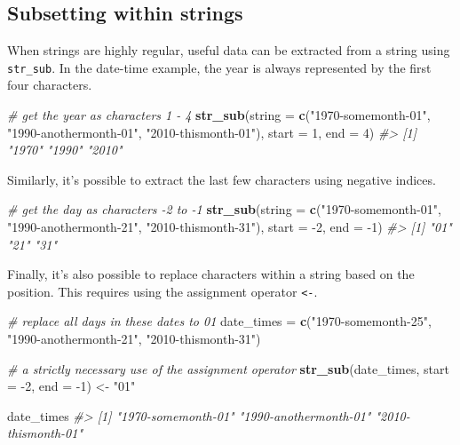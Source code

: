 \documentclass[]{book}
\newenvironment{Shaded}{}{}
\newcommand{\CommentTok}[1]{\textcolor[rgb]{0.38,0.63,0.69}{\textit{#1}}}
\newcommand{\DataTypeTok}[1]{\textcolor[rgb]{0.56,0.13,0.00}{#1}}
\newcommand{\DecValTok}[1]{\textcolor[rgb]{0.25,0.63,0.44}{#1}}
\newcommand{\KeywordTok}[1]{\textcolor[rgb]{0.00,0.44,0.13}{\textbf{#1}}}
\newcommand{\NormalTok}[1]{#1}
\newcommand{\StringTok}[1]{\textcolor[rgb]{0.25,0.44,0.63}{#1}}
\begin{document}
\hypertarget{subsetting-within-strings}{%
\subsection{Subsetting within strings}\label{subsetting-within-strings}}

When strings are highly regular, useful data can be extracted from a string using \texttt{str\_sub}. In the date-time example, the year is always represented by the first four characters.

\begin{Shaded}
\begin{Highlighting}[]
\CommentTok{# get the year as characters 1 - 4}
\KeywordTok{str_sub}\NormalTok{(}\DataTypeTok{string =} \KeywordTok{c}\NormalTok{(}\StringTok{"1970-somemonth-01"}\NormalTok{,}
                   \StringTok{"1990-anothermonth-01"}\NormalTok{,}
                   \StringTok{"2010-thismonth-01"}\NormalTok{),}
        \DataTypeTok{start =} \DecValTok{1}\NormalTok{, }\DataTypeTok{end =} \DecValTok{4}\NormalTok{)}
\CommentTok{#> [1] "1970" "1990" "2010"}
\end{Highlighting}
\end{Shaded}

Similarly, it's possible to extract the last few characters using negative indices.

\begin{Shaded}
\begin{Highlighting}[]
\CommentTok{# get the day as characters -2 to -1}
\KeywordTok{str_sub}\NormalTok{(}\DataTypeTok{string =} \KeywordTok{c}\NormalTok{(}\StringTok{"1970-somemonth-01"}\NormalTok{,}
                   \StringTok{"1990-anothermonth-21"}\NormalTok{,}
                   \StringTok{"2010-thismonth-31"}\NormalTok{),}
        \DataTypeTok{start =} \DecValTok{-2}\NormalTok{, }\DataTypeTok{end =} \DecValTok{-1}\NormalTok{)}
\CommentTok{#> [1] "01" "21" "31"}
\end{Highlighting}
\end{Shaded}

Finally, it's also possible to replace characters within a string based on the position. This requires using the assignment operator \texttt{\textless{}-}.

\begin{Shaded}
\begin{Highlighting}[]
\CommentTok{# replace all days in these dates to 01}
\NormalTok{date_times =}\StringTok{ }\KeywordTok{c}\NormalTok{(}\StringTok{"1970-somemonth-25"}\NormalTok{,}
               \StringTok{"1990-anothermonth-21"}\NormalTok{,}
               \StringTok{"2010-thismonth-31"}\NormalTok{)}

\CommentTok{# a strictly necessary use of the assignment operator}
\KeywordTok{str_sub}\NormalTok{(date_times,}
        \DataTypeTok{start =} \DecValTok{-2}\NormalTok{, }\DataTypeTok{end =} \DecValTok{-1}\NormalTok{) <-}\StringTok{ "01"}

\NormalTok{date_times}
\CommentTok{#> [1] "1970-somemonth-01"    "1990-anothermonth-01" "2010-thismonth-01"}
\end{Highlighting}
\end{Shaded}
\end{document}
